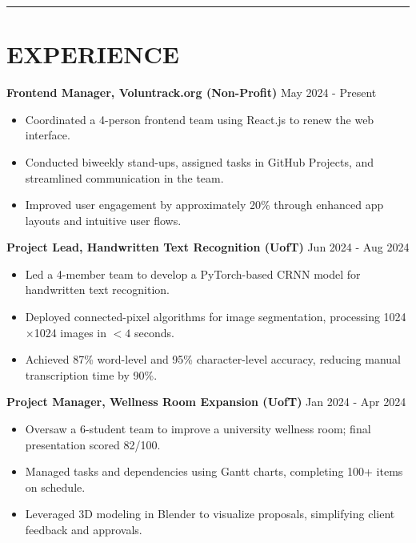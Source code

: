 \documentclass[a4paper,10pt]{article}
\begin{document}
\noindent\rule{\linewidth}{1pt}

\section*{\textbf{EXPERIENCE}}

\noindent\textbf{Frontend Manager, Voluntrack.org (Non-Profit)} \hfill May 2024 - Present
\begin{itemize}[leftmargin=0.2in]
    \item Coordinated a 4-person frontend team using React.js to renew the web interface.
    \item Conducted biweekly stand-ups, assigned tasks in GitHub Projects, and streamlined communication in the team.
    \item Improved user engagement by approximately 20\% through enhanced app layouts and intuitive user flows.
\end{itemize}

\vspace{0.3cm}
\noindent\textbf{Project Lead, Handwritten Text Recognition (UofT)} \hfill Jun 2024 - Aug 2024
\begin{itemize}[leftmargin=0.2in]
    \item Led a 4-member team to develop a PyTorch-based CRNN model for handwritten text recognition.
    \item Deployed connected-pixel algorithms for image segmentation, processing 1024$\times$1024 images in $<4$ seconds.
    \item Achieved 87\% word-level and 95\% character-level accuracy, reducing manual transcription time by 90\%.
\end{itemize}

\vspace{0.3cm}
\noindent\textbf{Project Manager, Wellness Room Expansion (UofT)} \hfill Jan 2024 - Apr 2024
\begin{itemize}[leftmargin=0.2in]
    \item Oversaw a 6-student team to improve a university wellness room; final presentation scored 82/100.
    \item Managed tasks and dependencies using Gantt charts, completing 100+ items on schedule.
    \item Leveraged 3D modeling in Blender to visualize proposals, simplifying client feedback and approvals.
\end{itemize}
\end{document}
